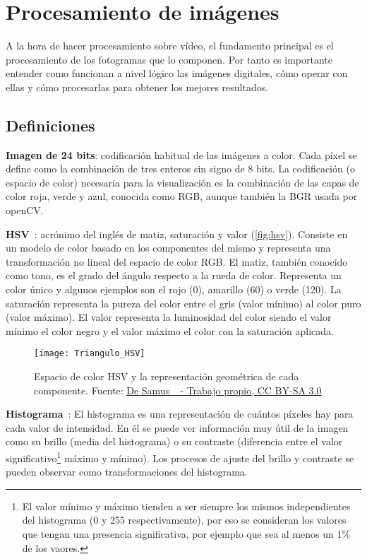 \section{Procesamiento de imágenes}\label{sec:teccv}

A la hora de hacer procesamiento sobre vídeo, el fundamento principal es el procesamiento de los fotogramas que lo componen. Por tanto es importante entender como funcionan a nivel lógico las imágenes digitales, cómo operar con ellas y cómo procesarlas para obtener los mejores resultados.

\subsection{Definiciones}

\textbf{Imagen de 24 bits}: codificación habitual de las imágenes a color. Cada píxel se define como la combinación de tres enteros sin signo de 8 bits. La codificación (o espacio de color) necesaria para la visualización es la combinación de las capas de color roja, verde y azul, conocida como RGB, aunque también la BGR usada por openCV. 

\textbf{HSV}~\cite{wiki:hsv}: acrónimo del inglés de matiz, saturación y valor (\autoref{fig:hsv}). Consiste en un modelo de color basado en los componentes del mismo y representa una transformación no lineal del espacio de color RGB. El matiz, también conocido como tono, es el grado del ángulo respecto a la rueda de color. Representa un color único y algunos ejemplos son el rojo (0\grado), amarillo (60\grado) o verde (120\grado). La saturación representa la pureza del color entre el gris (valor mínimo) al color puro (valor máximo). El valor representa la luminosidad del color siendo el valor mínimo el color negro y el valor máximo el color con la saturación aplicada.

\begin{figure}
	\centering
	\texttt{[image: Triangulo\_HSV]}
	\caption[Espacio de color HSV y la representación geométrica de cada componente.]{Espacio de color HSV y la representación geométrica de cada componente. Fuente: \href{https://commons.wikimedia.org/w/index.php?curid=1302915}{De Samus\_ - Trabajo propio, CC BY-SA 3.0}}
	\label{fig:hsv}
\end{figure}

\textbf{Histograma}~\cite{garrido2019opencv}: El histograma es una representación de cuántos píxeles hay para cada valor de intensidad. En él se puede ver información muy útil de la imagen como su brillo (media del histograma) o su contraste (diferencia entre el valor significativo\footnote{El valor mínimo y máximo tienden a ser siempre los mismos independientes del histograma (0 y 255 respectivamente), por eso se consideran los valores que tengan una presencia significativa, por ejemplo que sea al menos un 1\% de los vaores.} máximo y mínimo). Los procesos de ajuste del brillo y contraste se pueden observar como transformaciones del histograma.

